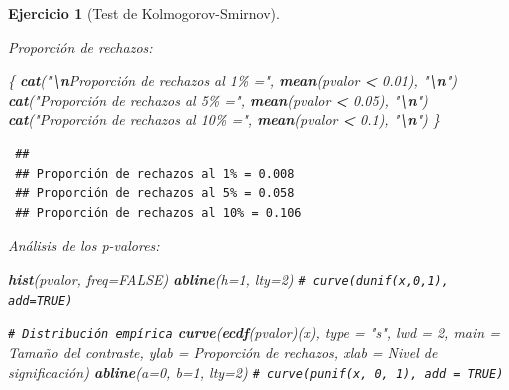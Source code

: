 \documentclass[
  spanish,
  10pt,
]{book}
\newenvironment{Shaded}{\begin{snugshade}}{\end{snugshade}}
\newcommand{\AttributeTok}[1]{\textcolor[rgb]{0.13,0.29,0.53}{#1}}
\newcommand{\CommentTok}[1]{\textcolor[rgb]{0.56,0.35,0.01}{\textit{#1}}}
\newcommand{\ConstantTok}[1]{\textcolor[rgb]{0.56,0.35,0.01}{#1}}
\newcommand{\DecValTok}[1]{\textcolor[rgb]{0.00,0.00,0.81}{#1}}
\newcommand{\FloatTok}[1]{\textcolor[rgb]{0.00,0.00,0.81}{#1}}
\newcommand{\FunctionTok}[1]{\textcolor[rgb]{0.13,0.29,0.53}{\textbf{#1}}}
\newcommand{\NormalTok}[1]{#1}
\newcommand{\SpecialCharTok}[1]{\textcolor[rgb]{0.81,0.36,0.00}{\textbf{#1}}}
\newcommand{\StringTok}[1]{\textcolor[rgb]{0.31,0.60,0.02}{#1}}
\theoremstyle{break}
\newtheorem{exercise}{Ejercicio}[chapter]
\theoremstyle{nonumberplain}
\renewcommand{\CommentTok}[1]{\textcolor[rgb]{0.41,0.41,0.41}{\texttt{#1}}}
\begin{document}
\begin{exercise}[Test de Kolmogorov-Smirnov]
\begin{enumerate}
  Proporción de rechazos:

\begin{Shaded}
\begin{Highlighting}[]
\NormalTok{\{}
  \FunctionTok{cat}\NormalTok{(}\StringTok{"}\SpecialCharTok{\textbackslash{}n}\StringTok{Proporción de rechazos al 1\% ="}\NormalTok{, }\FunctionTok{mean}\NormalTok{(pvalor }\SpecialCharTok{\textless{}} \FloatTok{0.01}\NormalTok{), }\StringTok{"}\SpecialCharTok{\textbackslash{}n}\StringTok{"}\NormalTok{)}
  \FunctionTok{cat}\NormalTok{(}\StringTok{"Proporción de rechazos al 5\% ="}\NormalTok{, }\FunctionTok{mean}\NormalTok{(pvalor }\SpecialCharTok{\textless{}} \FloatTok{0.05}\NormalTok{), }\StringTok{"}\SpecialCharTok{\textbackslash{}n}\StringTok{"}\NormalTok{)}
  \FunctionTok{cat}\NormalTok{(}\StringTok{"Proporción de rechazos al 10\% ="}\NormalTok{, }\FunctionTok{mean}\NormalTok{(pvalor }\SpecialCharTok{\textless{}} \FloatTok{0.1}\NormalTok{), }\StringTok{"}\SpecialCharTok{\textbackslash{}n}\StringTok{"}\NormalTok{)}
\NormalTok{\}}
\end{Highlighting}
\end{Shaded}

\begin{verbatim}
 ## 
 ## Proporción de rechazos al 1% = 0.008 
 ## Proporción de rechazos al 5% = 0.058 
 ## Proporción de rechazos al 10% = 0.106
\end{verbatim}

  Análisis de los p-valores:

\begin{Shaded}
\begin{Highlighting}[]
\FunctionTok{hist}\NormalTok{(pvalor, }\AttributeTok{freq=}\ConstantTok{FALSE}\NormalTok{)}
\FunctionTok{abline}\NormalTok{(}\AttributeTok{h=}\DecValTok{1}\NormalTok{, }\AttributeTok{lty=}\DecValTok{2}\NormalTok{)   }\CommentTok{\# curve(dunif(x,0,1), add=TRUE)}

\CommentTok{\# Distribución empírica}
\FunctionTok{curve}\NormalTok{(}\FunctionTok{ecdf}\NormalTok{(pvalor)(x), }\AttributeTok{type =} \StringTok{"s"}\NormalTok{, }\AttributeTok{lwd =} \DecValTok{2}\NormalTok{, }
      \AttributeTok{main =} \StringTok{\textquotesingle{}Tamaño del contraste\textquotesingle{}}\NormalTok{, }\AttributeTok{ylab =} \StringTok{\textquotesingle{}Proporción de rechazos\textquotesingle{}}\NormalTok{, }
      \AttributeTok{xlab =} \StringTok{\textquotesingle{}Nivel de significación\textquotesingle{}}\NormalTok{)}
\FunctionTok{abline}\NormalTok{(}\AttributeTok{a=}\DecValTok{0}\NormalTok{, }\AttributeTok{b=}\DecValTok{1}\NormalTok{, }\AttributeTok{lty=}\DecValTok{2}\NormalTok{)   }\CommentTok{\# curve(punif(x, 0, 1), add = TRUE) }
\end{Highlighting}
\end{Shaded}


\end{enumerate}
\end{exercise}
\end{document}
